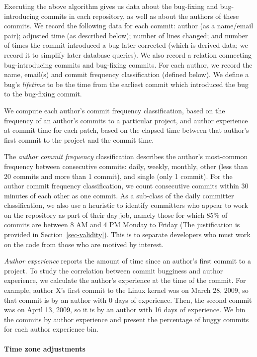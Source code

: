 Executing the above algorithm gives us data about the bug-fixing and
bug-introducing commits in each repository, as well as about the authors of
these commits. We record the following data for each commit: author (as a
name/email pair); adjusted time (as described below); number of lines changed;
and number of times the commit introduced a bug later corrected (which is
derived data; we record it to simplify later database queries). We also record a
relation connecting bug-introducing commits and bug-fixing commits. For each
author, we record the name, email(s) and 
commit frequency classification (defined below). We define a
bug's {\em lifetime} to be the time from the earliest commit which introduced 
the bug to the bug-fixing commit.

We compute each author's commit frequency classification, based on the frequency of an
author's commits to a particular project, and author experience at commit time
for each patch, based on the elapsed time between that author's first commit to
the project and the commit time.

The {\em author commit frequency} classification describes the author's most-common
frequency between consecutive commits: daily, weekly, monthly, other (less than
20 commits and more than 1 commit), and single (only 1 commit). For the author commit frequency classification,
we count consecutive commits within 30 minutes of each other as one commit. As a
sub-class of the daily committer classification, we also use a heuristic to
identify committers who appear to work on the repository as part of their day
job, namely those for which 85\% of commits are between 8 AM and 4 PM Monday to
Friday (The justification is provided in Section~\ref{sec-validity}). This is to separate developers who must work on the code from those who
are motived by interest.

{\em Author experience} reports the amount of time since an author's first
commit to a project. To study the correlation between commit bugginess and
author experience, we calculate the author's experience at the time of the
commit. For example, author X's first commit to the Linux kernel was on March
28, 2009, so that commit is by an author with 0 days of experience. Then, the
second commit was on April 13, 2009, so it is by an author with 16 days of
experience. We bin the commits by author experience and present the percentage
of buggy commits for each author experience bin.
 
\paragraph{Time zone adjustments}

